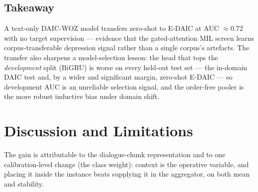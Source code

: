 \documentclass[conference]{IEEEtran}
\begin{document}
\begin{table}[t]
\caption{Zero-shot cross-corpus transfer.
ROC-AUC as 30-seed per-seed mean$\pm$std; the E-DAIC column adds a subject-level
bootstrap 95\% CI (2000 resamples of the 56 test subjects) on the seed-ensemble,
shown here because E-DAIC is the new (transfer) result --- the in-domain
DAIC-WOZ bootstrap CIs are already in .
The order-free model wins the transfer despite the GRU winning the DAIC
development split.}
\label{tab:edaic}
\centering\small
\setlength{\tabcolsep}{4pt}
\end{table}

\subsection{Takeaway}
\label{sec:edaic-takeaway}
A text-only DAIC-WOZ model transfers zero-shot to E-DAIC at AUC $\approx\!0.72$
with no target supervision --- evidence that the gated-attention MIL screen
learns corpus-transferable depression signal rather than a single corpus's
artefacts. The transfer also sharpens a model-selection lesson: the head that
tops the \emph{development} split (BiGRU) is worse on every held-out test set ---
the in-domain DAIC test and, by a wider and significant margin, zero-shot
E-DAIC --- so development AUC is an unreliable selection signal, and the
order-free pooler is the more robust inductive bias under domain shift.

\section{Discussion and Limitations}

The gain is attributable to the dialogue-chunk representation and to one
calibration-level change (the class weight): context is the operative variable,
and placing it inside the instance beats supplying it in the aggregator, on both
mean and stability.
\end{document}
